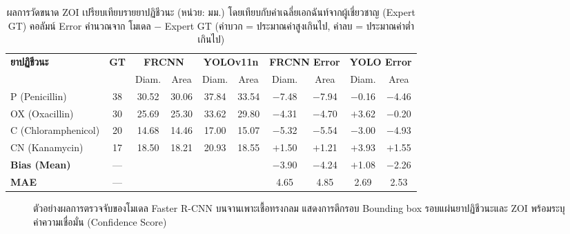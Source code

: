 \begin{table}[H]
  \centering
  \caption{ผลการวัดขนาด ZOI เปรียบเทียบรายยาปฏิชีวนะ (หน่วย: มม.)
           โดยเทียบกับค่าเฉลี่ยเอกฉันท์จากผู้เชี่ยวชาญ (Expert GT) 
           คอลัมน์ Error คำนวณจาก โมเดล $-$ Expert GT 
           (ค่าบวก = ประมาณค่าสูงเกินไป, ค่าลบ = ประมาณค่าต่ำเกินไป)}
  \label{tab:model_comparison}
  \renewcommand{\arraystretch}{1.15}
  \begin{tabular}{lccccccccc}
    \toprule
    \multirow{2}{*}{\textbf{ยาปฏิชีวนะ}} &
    \multirow{2}{*}{\textbf{GT}} &
    \multicolumn{2}{c}{\textbf{FRCNN}} &
    \multicolumn{2}{c}{\textbf{YOLOv11n}} &
    \multicolumn{2}{c}{\textbf{FRCNN Error}} &
    \multicolumn{2}{c}{\textbf{YOLO Error}} \\
    \cmidrule(lr){3-4}\cmidrule(lr){5-6}\cmidrule(lr){7-8}\cmidrule(lr){9-10}
    & & Diam. & Area & Diam. & Area & Diam. & Area & Diam. & Area \\
    \midrule
    P  (Penicillin)       & 38 & 30.52 & 30.06 & 37.84 & 33.54 & $-$7.48 & $-$7.94 & $-$0.16 & $-$4.46 \\
    OX (Oxacillin)        & 30 & 25.69 & 25.30 & 33.62 & 29.80 & $-$4.31 & $-$4.70 & $+$3.62 & $-$0.20 \\
    C  (Chloramphenicol)  & 20 & 14.68 & 14.46 & 17.00 & 15.07 & $-$5.32 & $-$5.54 & $-$3.00 & $-$4.93 \\
    CN (Kanamycin)        & 17 & 18.50 & 18.21 & 20.93 & 18.55 & $+$1.50 & $+$1.21 & $+$3.93 & $+$1.55 \\
    \midrule
    \textbf{Bias (Mean)}  & --- & \multicolumn{2}{c}{} & \multicolumn{2}{c}{} &
                            $-$3.90 & $-$4.24 &
                            $+$1.08 & $-$2.26 \\
    \textbf{MAE}          & --- & \multicolumn{2}{c}{} & \multicolumn{2}{c}{} &
                            4.65 & 4.85 &
                            2.69 & 2.53 \\
    \bottomrule
  \end{tabular}
\end{table}

\begin{figure}[H]
  \centering
  \caption{ตัวอย่างผลการตรวจจับของโมเดล Faster R-CNN บนจานเพาะเชื้อทรงกลม แสดงการตีกรอบ Bounding box
    รอบแผ่นยาปฏิชีวนะและ ZOI พร้อมระบุค่าความเชื่อมั่น (Confidence Score)}
  \label{fig:frcnn_result}
\end{figure}

